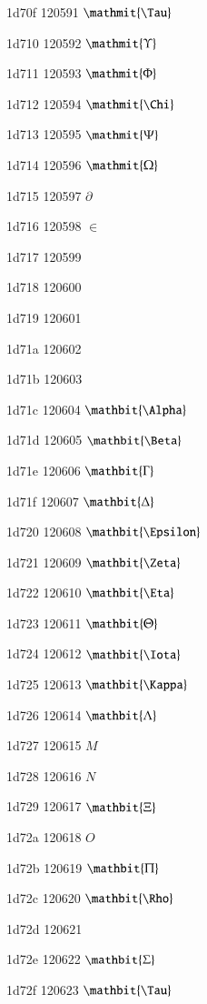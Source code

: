\documentclass[11pt]{article}
\begin{document}
1d70f 120591 \ensuremath{\mathmit{\Tau}}

1d710 120592 \ensuremath{\mathmit{\Upsilon}}

1d711 120593 \ensuremath{\mathmit{\Phi}}

1d712 120594 \ensuremath{\mathmit{\Chi}}

1d713 120595 \ensuremath{\mathmit{\Psi}}

1d714 120596 \ensuremath{\mathmit{\Omega}}

1d715 120597 \ensuremath{\partial}

1d716 120598 \ensuremath{\in}

1d717 120599 \mathmit{\vartheta}

1d718 120600 \mathmit{\varkappa}

1d719 120601 \mathmit{\phi}

1d71a 120602 \mathmit{\varrho}

1d71b 120603 \mathmit{\varpi}

1d71c 120604 \ensuremath{\mathbit{\Alpha}}

1d71d 120605 \ensuremath{\mathbit{\Beta}}

1d71e 120606 \ensuremath{\mathbit{\Gamma}}

1d71f 120607 \ensuremath{\mathbit{\Delta}}

1d720 120608 \ensuremath{\mathbit{\Epsilon}}

1d721 120609 \ensuremath{\mathbit{\Zeta}}

1d722 120610 \ensuremath{\mathbit{\Eta}}

1d723 120611 \ensuremath{\mathbit{\Theta}}

1d724 120612 \ensuremath{\mathbit{\Iota}}

1d725 120613 \ensuremath{\mathbit{\Kappa}}

1d726 120614 \ensuremath{\mathbit{\Lambda}}

1d727 120615 \ensuremath{M}

1d728 120616 \ensuremath{N}

1d729 120617 \ensuremath{\mathbit{\Xi}}

1d72a 120618 \ensuremath{O}

1d72b 120619 \ensuremath{\mathbit{\Pi}}

1d72c 120620 \ensuremath{\mathbit{\Rho}}

1d72d 120621 

1d72e 120622 \ensuremath{\mathbit{\Sigma}}

1d72f 120623 \ensuremath{\mathbit{\Tau}}
\end{document}
